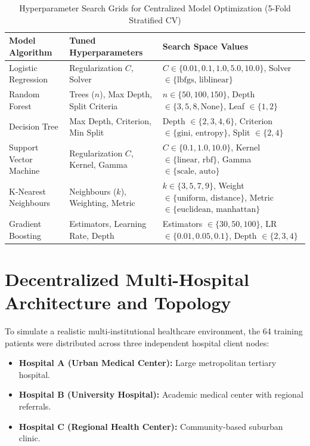 \documentclass[12pt,a4paper,oneside]{report}
\begin{document}
\begin{table}[htbp]
\centering
\caption{Hyperparameter Search Grids for Centralized Model Optimization (5-Fold Stratified CV)}
\label{tab:hyperparam_grids}
\begin{tabular}{@{}llp{6.5cm}@{}}
\toprule
\textbf{Model Algorithm} & \textbf{Tuned Hyperparameters} & \textbf{Search Space Values} \\ \midrule
Logistic Regression & Regularization $C$, Solver & $C \in \{0.01, 0.1, 1.0, 5.0, 10.0\}$, Solver $\in \{\text{lbfgs, liblinear}\}$ \\
Random Forest & Trees ($n$), Max Depth, Split Criteria & $n \in \{50, 100, 150\}$, Depth $\in \{3, 5, 8, \text{None}\}$, Leaf $\in \{1, 2\}$ \\
Decision Tree & Max Depth, Criterion, Min Split & Depth $\in \{2, 3, 4, 6\}$, Criterion $\in \{\text{gini, entropy}\}$, Split $\in \{2, 4\}$ \\
Support Vector Machine & Regularization $C$, Kernel, Gamma & $C \in \{0.1, 1.0, 10.0\}$, Kernel $\in \{\text{linear, rbf}\}$, Gamma $\in \{\text{scale, auto}\}$ \\
K-Nearest Neighbours & Neighbours ($k$), Weighting, Metric & $k \in \{3, 5, 7, 9\}$, Weight $\in \{\text{uniform, distance}\}$, Metric $\in \{\text{euclidean, manhattan}\}$ \\
Gradient Boosting & Estimators, Learning Rate, Depth & Estimators $\in \{30, 50, 100\}$, LR $\in \{0.01, 0.05, 0.1\}$, Depth $\in \{2, 3, 4\}$ \\ \bottomrule
\end{tabular}
\end{table}

\section{Decentralized Multi-Hospital Architecture and Topology}
\label{sec:decentralized_topology}

To simulate a realistic multi-institutional healthcare environment, the 64 training patients were distributed across three independent hospital client nodes:
\begin{itemize}
    \item \textbf{Hospital A (Urban Medical Center):} Large metropolitan tertiary hospital.
    \item \textbf{Hospital B (University Hospital):} Academic medical center with regional referrals.
    \item \textbf{Hospital C (Regional Health Center):} Community-based suburban clinic.
\end{itemize}
\end{document}
